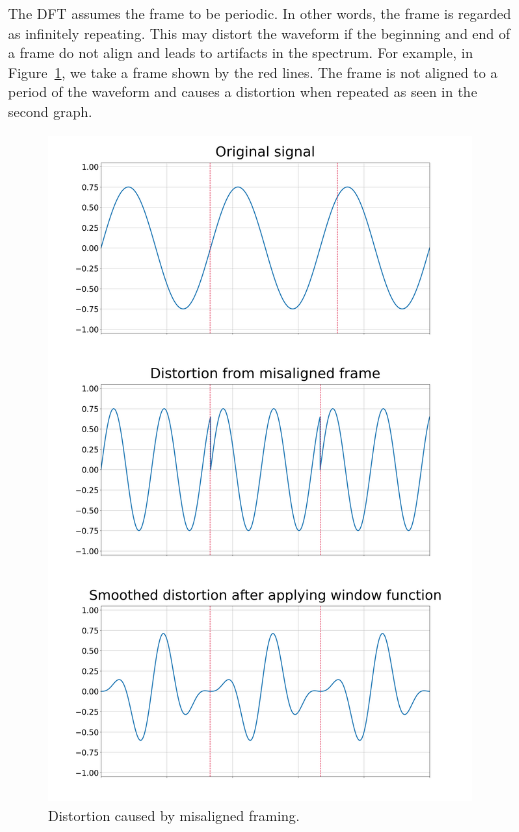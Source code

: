 \documentclass[a4paper,10pt,twocolumn]{article}
\begin{document}
The DFT assumes the frame to be periodic. In other words, the frame is regarded as infinitely repeating. This may distort the waveform if the beginning and end of a frame do not align and leads to artifacts in the spectrum. For example, in Figure~\ref{fig:framedistortion}, we take a frame shown by the red lines. The frame is not aligned to a period of the waveform and causes a distortion when repeated as seen in the second graph. %
\begin{figure}[t]
    \centering
    \includegraphics[width=\linewidth]{fig/framedistortion.png}
    \caption{Distortion caused by misaligned framing.}
    \label{fig:framedistortion}
\end{figure}
\end{document}
